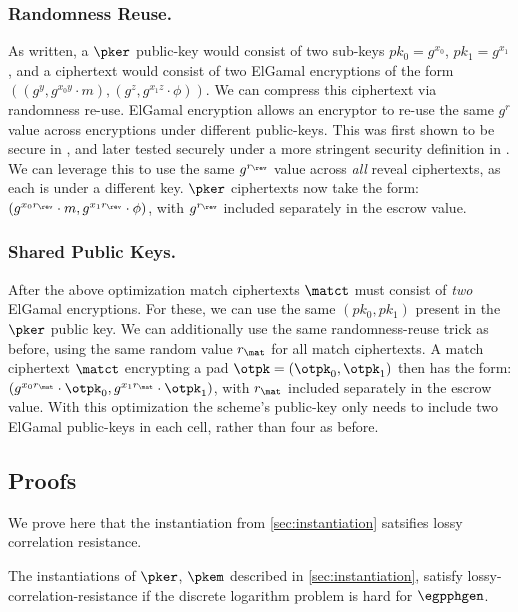 \subsubsection{Randomness Reuse.}
As written, a $\pker$ public-key would consist of two sub-keys $pk_0 = g^{x_0}$, $pk_1 = g^{x_1}$, and a ciphertext would consist of two ElGamal encryptions of the form
$((g^y, g^{x_0y}\cdot m), (g^z, g^{x_1z} \cdot \phi))$.
We can compress this ciphertext via randomness re-use.
ElGamal encryption allows an encryptor to re-use the same $g^r$ value across encryptions under different public-keys.
This was first shown to be secure in \cite{PKC:Kurosawa02}, and later tested securely under a more stringent security definition in \cite{PKC:BelBolSta03}.
We can leverage this to use the same $g^{r_{\rev}}$ value across \emph{all} reveal ciphertexts, as each is under a different key.
$\pker$ ciphertexts now take the form:
$(g^{x_0r_{\rev}}\cdot m, g^{x_1r_{\rev}} \cdot \phi)$,
with $g^{r_{\rev}}$ included separately in the escrow value.

\subsubsection{Shared Public Keys.}
After the above optimization match ciphertexts $\matct$ must consist of \emph{two} ElGamal encryptions.
For these, we can use the same $(pk_0, pk_1)$ present in the $\pker$ public key.
We can additionally use the same randomness-reuse trick as before, using the same random value $r_{\mat}$ for all match ciphertexts.
A match ciphertext $\matct$ encrypting a pad $\otpk = (\otpk_0, \otpk_1)$ then has the form:
$(g^{x_0r_{\mat}} \cdot \otpk_0, g^{x_1r_{\mat}} \cdot \otpk_1)$,
with $r_{\mat}$ included separately in the escrow value.
With this optimization the scheme's public-key only needs to include two ElGamal public-keys in each cell, rather than four as before.

\subsection{Proofs}
We prove here that the instantiation from \cref{sec:instantiation} satsifies lossy correlation resistance.

\begin{theorem}
	The instantiations of $\pker$, $\pkem$ described in \cref{sec:instantiation}, satisfy lossy-correlation-resistance if the discrete logarithm problem is hard for $\egpphgen$.
\end{theorem}

